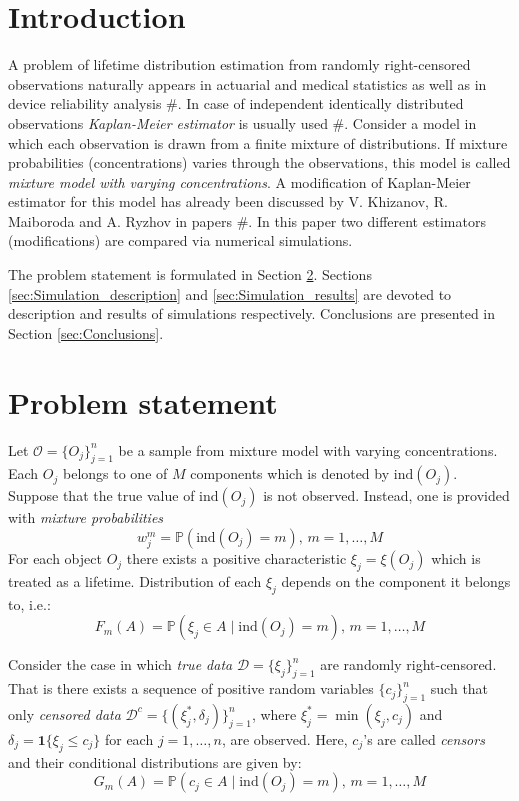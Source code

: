 \documentclass[12pt,reqno,a4paper,oneside,draft]{article}
\theoremstyle{plain}
\theoremstyle{definition}
\theoremstyle{remark}
\begin{document}
\tableofcontents


\section{Introduction}
\label{sec:Introduction}
A problem of lifetime distribution estimation from randomly right-censored observations naturally appears in actuarial and medical statistics as well as in device reliability analysis $\#$. In case of independent identically distributed observations \emph{Kaplan-Meier estimator} is usually used $\#$. Consider a model in which each observation is drawn from a finite mixture of distributions. If mixture probabilities (concentrations) varies through the observations, this model is called \emph{mixture model with varying concentrations}. A modification of Kaplan-Meier estimator for this model has already been discussed by V. Khizanov, R. Maiboroda and A. Ryzhov in papers $\#$. In this paper two different estimators (modifications) are compared via numerical simulations.

The problem statement is formulated in Section \ref{sec:Problem_statement}. Sections \ref{sec:Simulation_description} and \ref{sec:Simulation_results} are devoted to description and results of simulations respectively. Conclusions are presented in Section \ref{sec:Conclusions}.

\section{Problem statement}
\label{sec:Problem_statement}
Let $\mathcal O = \{O_j\}_{j=1}^n$ be a sample from mixture model with varying concentrations. Each $O_j$ belongs to one of $M$ components which is denoted by $\mathrm{ind}(O_j)$. Suppose that the true value of $\mathrm{ind}(O_j)$ is not observed. Instead, one is provided with \emph{mixture probabilities}
\begin{equation}
\label{eq:mixture_probabilities}
w_j^m = \mathbb P(\mathrm{ind}(O_j) = m), \, m=1,\ldots, M
\end{equation}
For each object $O_j$ there exists a positive characteristic $\xi _j = \xi (O_j)$ which is treated as a lifetime. Distribution of each $\xi _j$ depends on the component it belongs to, i.e.:
\begin{equation}
\label{eq:conditional_distribution}
F_m (A) = \mathbb P(\xi _j \in A \mid \mathrm{ind}(O_j) = m), \, m=1,\ldots , M
\end{equation}

Consider the case in which \emph{true data} $\mathcal D = \{\xi _j\}_{j=1}^n$ are randomly right-censored. That is there exists a sequence of positive random variables $\{c_j\}_{j=1}^n$ such that only \emph{censored data} $\mathcal D^c = \{(\xi _j^*, \delta _j)\}_{j=1}^n$, where $\xi _j^* = \min (\xi _j, c_j)$ and $\delta _j = \mathbf 1\{\xi _j \leq c_j\}$ for each $j=1,\ldots ,n$, are observed. Here, $c_j$'s are called \emph{censors} and their conditional distributions are given by:
\begin{equation}
G_m (A) = \mathbb P(c _j \in A \mid \mathrm{ind}(O_j) = m),\, m=1,\ldots , M
\end{equation} 
\end{document}
